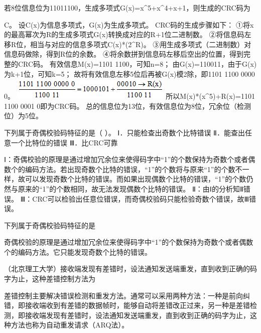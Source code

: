 \question 若8位信息位为11011100，生成多项式G(x)=x\^{}5+x\^{}4+x+1，则生成的CRC码为
\par{}
\begin{solution}C。 设C(x)为信息多项式，G(x)为生成多项式。 CRC码的生成步骤如下：
①将x的最高幂次为R的生成多项式G(x)转换成对应的R+1位二进制数。
②将信息码左移R位，相当与对应的信息多项式C(x)*(2\^{}R)。
③用生成多项式（二进制数）对信息码做除，得到R位的余数。
④将余数拼到信息码左移后空出的位置，得到完整的CRC码。 有效信息M(x)=1101
1100，可知n=8； 由G(x)=110011，由于G(x)为k+1位，可知k=5；
故将有效信息左移5位后再被G(x)模2除，即1101 1100 0000 0。
\includegraphics[width=3.04167in,height=0.41667in]{computerassets/37425042f260ca5a3767b94bc041794b.jpeg}
所以M(x)*(x\^{}5)+R(x)=1101 1100 0001 0即为CRC码。
总的信息位为13位，有效信息位为8位，冗余位（检测位）为5位。
\end{solution}
\question 下列属于奇偶校验码特征的是（ ）。 Ⅰ．只能检查出奇数个比特错误
Ⅱ．能查出任意一个比特位的错误 Ⅲ．比CRC可靠
\par{}
\begin{solution}Ⅰ：奇偶校验的原理是通过增加冗余位来使得码字中``1''的个数保持为奇数个或者偶数个的编码方法。若出现奇数个比特的错误，``1''的个数将与原来``1''的个数不一样，故可以发现奇数个比特的错误。而如果出现偶数个比特的错误，``1''的个数仍然与原来的``1''的个数相同，故无法发现偶数个比特的错误。
Ⅱ：由Ⅰ的分析知Ⅱ错误。
Ⅲ：CRC可以检验出任意位错误，而奇偶校验码只能检验奇数个错误，故Ⅲ错误。
\end{solution}
\question 下列属于奇偶校验码特征的是
\par{}
\begin{solution}奇偶校验的原理是通过增加冗余位来使得码字中``1''的个数保持为奇数个或者偶数个的编码方法。它只能发现奇数个比特的错误。
\end{solution}
\question （北京理工大学）接收端发现有差错时，设法通知发送端重发，直到收到正确的码字为止，这种差错控制方法为
\par{}
\begin{solution}差错控制主要解决错误检测和重发方法。通常可以采用两种方法：一种是前向纠错，即接收端收到有差错的数据帧时，能够自动将差错改正过来，另一种是差错检测，即接收端发现有差错时，设法通知发送端重发，直到收到正确的码字为止，这种方法也称为自动重发请求（ARQ法）。
\end{solution}
